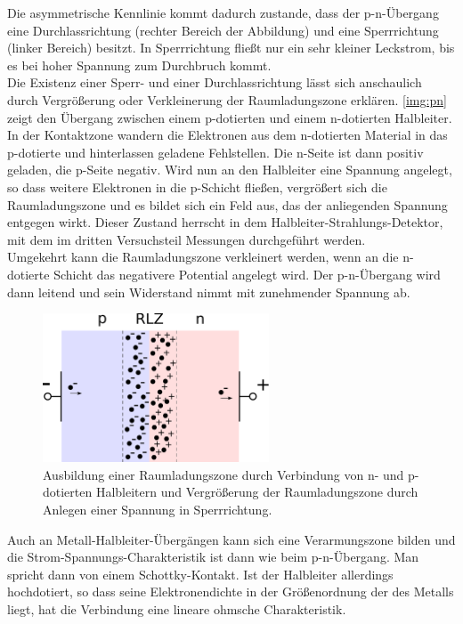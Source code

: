 Die asymmetrische Kennlinie kommt dadurch zustande,
dass der p-n-Übergang eine Durchlassrichtung (rechter Bereich der Abbildung) und eine Sperrrichtung
(linker Bereich) besitzt.
In Sperrrichtung fließt nur ein sehr kleiner Leckstrom, bis es bei hoher Spannung zum Durchbruch kommt.\\
Die Existenz einer Sperr- und einer Durchlassrichtung lässt sich anschaulich durch Vergrößerung
oder Verkleinerung der Raumladungszone erklären.
\autoref{img:pn} zeigt den Übergang zwischen einem p-dotierten und einem n-dotierten Halbleiter.
In der Kontaktzone wandern die Elektronen aus dem n-dotierten Material in das p-dotierte und hinterlassen
geladene Fehlstellen.
Die n-Seite ist dann positiv geladen, die p-Seite negativ.
Wird nun an den Halbleiter eine Spannung angelegt, so dass weitere Elektronen in die p-Schicht fließen,
vergrößert sich die Raumladungszone und es bildet sich ein Feld aus,
das der anliegenden Spannung entgegen wirkt.
Dieser Zustand herrscht in dem Halbleiter-Strahlungs-Detektor,
mit dem im dritten Versuchsteil Messungen durchgeführt werden.\\
Umgekehrt kann die Raumladungszone verkleinert werden,
wenn an die n-dotierte Schicht das negativere Potential angelegt wird.
Der p-n-Übergang wird dann leitend und sein Widerstand nimmt mit zunehmender Spannung ab.
\begin{figure}[H]
\begin{center}
  \includegraphics[width=0.6\textwidth]{../img/pn.pdf}
  \caption{Ausbildung einer Raumladungszone durch Verbindung von n- und p-dotierten Halbleitern
  und Vergrößerung der Raumladungszone durch Anlegen einer Spannung in Sperrrichtung.}
  \label{img:pn}
\end{center}
\end{figure}
Auch an Metall-Halbleiter-Übergängen kann sich eine Verarmungszone bilden und die
Strom-Spannungs-Charakteristik ist dann wie beim p-n-Übergang.
Man spricht dann von einem Schottky-Kontakt.
Ist der Halbleiter allerdings hochdotiert,
so dass seine Elektronendichte in der Größenordnung der des Metalls liegt,
hat die Verbindung eine lineare ohmsche Charakteristik.


